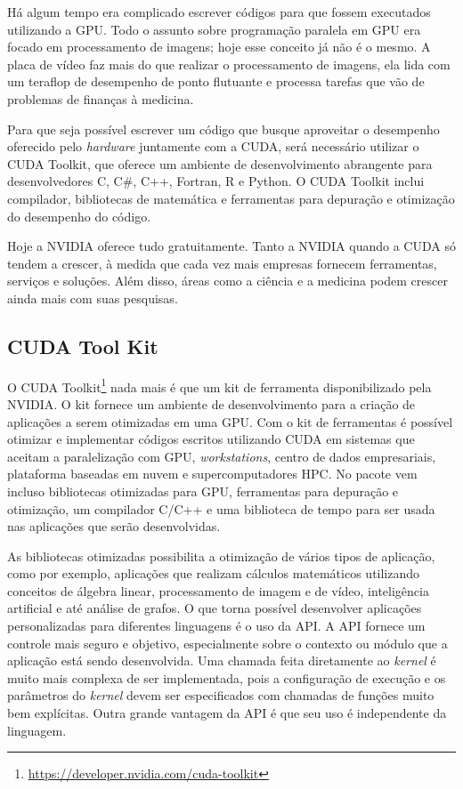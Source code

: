 \documentclass[
	12pt,				%
	openright,			%
	twoside,			%
	a4paper,			%
	english,			%
	french,				%
	spanish,			%
	brazil				%
	]{abntex2}
\begin{document}
Há algum tempo era complicado escrever códigos para que fossem executados utilizando a GPU. Todo o assunto sobre programação paralela em GPU era focado em processamento de imagens; hoje esse conceito já não é o mesmo. A placa de vídeo faz mais do que realizar o processamento de imagens, ela lida com um teraflop de desempenho de ponto flutuante e processa tarefas que vão de problemas de finanças à medicina.

Para que seja possível escrever um código que busque aproveitar o desempenho oferecido pelo \textit{hardware} juntamente com a CUDA, será necessário utilizar o CUDA Toolkit, que oferece um ambiente de desenvolvimento abrangente para desenvolvedores C, C\#, C++, Fortran, R e Python. O CUDA Toolkit inclui compilador, bibliotecas de matemática e ferramentas para depuração e otimização do desempenho do código.

Hoje a NVIDIA oferece tudo gratuitamente. Tanto a NVIDIA quando a CUDA  só tendem a crescer, à medida que cada vez mais empresas fornecem ferramentas, serviços e soluções. Além disso, áreas como a ciência e a medicina podem crescer ainda mais com suas pesquisas.

\subsection[CUDA Tool Kit]{CUDA Tool Kit}

O CUDA Toolkit\footnote{\url{https://developer.nvidia.com/cuda-toolkit}} nada mais é que um kit de ferramenta disponibilizado pela NVIDIA. O kit fornece um ambiente de desenvolvimento para a criação de aplicações a serem otimizadas em uma GPU. Com o kit de ferramentas é possível otimizar e implementar códigos escritos utilizando CUDA em sistemas que aceitam a paralelização com GPU, \textit{workstations}, centro de dados empresariais, plataforma baseadas em nuvem e supercomputadores HPC. No pacote vem incluso bibliotecas otimizadas para GPU, ferramentas para depuração e otimização, um compilador C/C++ e uma biblioteca de tempo para ser usada nas aplicações que serão desenvolvidas.

As bibliotecas otimizadas possibilita a otimização de vários tipos de aplicação, como por exemplo, aplicações que realizam cálculos matemáticos utilizando conceitos de álgebra linear, processamento de imagem e de vídeo, inteligência artificial e até análise de grafos. O que torna possível desenvolver aplicações personalizadas para diferentes linguagens é o uso da API. A API fornece um controle mais seguro e objetivo, especialmente sobre o contexto ou módulo que a aplicação está sendo desenvolvida. Uma chamada feita diretamente ao \textit{kernel} é muito mais complexa de ser implementada, pois a configuração de execução e os parâmetros do \textit{kernel} devem ser especificados com chamadas de funções muito bem explícitas. Outra grande vantagem da API é que seu uso é independente da linguagem.
\end{document}

